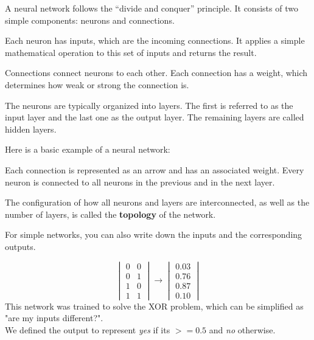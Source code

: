 A neural network follows the “divide and conquer” principle. It consists of two simple components: neurons and connections.

Each neuron has inputs, which are the incoming connections. It applies a simple mathematical operation to this set of inputs and returns the result.

Connections connect neurons to each other. Each connection has a weight, which determines how weak or strong the connection is.

The neurons are typically organized into layers. The first is referred to as the input layer and the last one as the output layer. The remaining layers are called hidden layers. \cite{Anderson1995}

Here is a basic example of a neural network:

{\centering
	\begin{neuralnetwork}[height=3, nodespacing=1.5cm]
		\newcommand{\nodelabel}[2]{
			\ifnum#1=0 $x_#2$ \fi
			\ifnum#1=1 $y_#2$ \fi
			\ifnum#1=2 $z_#2$ \fi
		}
		\setdefaultnodetext{\nodelabel}
		\hiddenlayer[count=3, bias=false, title=Hidden] \linklayers
		\outputlayer[count=1, title=Output] \linklayers
	\end{neuralnetwork}
\par}

Each connection is represented as an arrow and has an associated weight. Every neuron is connected to all neurons in the previous and in the next layer.

The configuration of how all neurons and layers are interconnected, as well as the number of layers, is called the \textbf{topology} of the network.\cite{Anderson1995}


For simple networks, you can also write down the inputs and the corresponding outputs.

\[
	\begin{vmatrix} 0 & 0 \\ 0 & 1 \\ 1 & 0 \\ 1 & 1 \end{vmatrix}
	\rightarrow
	\begin{vmatrix} 0.03 \\ 0.76 \\ 0.87 \\ 0.10 \end{vmatrix}	
\]
This network was trained to solve the XOR problem, which can be simplified as "are my inputs different?".\\
We defined the output to represent \emph{yes} if its $>= 0.5$ and \emph{no} otherwise.

